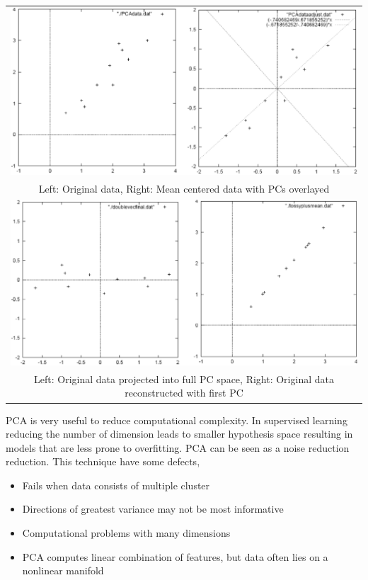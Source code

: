 \documentclass[main.tex]{subfiles}
\begin{document}
\begin{center}
\begin{tabular}{c}
  \includegraphics[width=140mm]{img/PAC_1.PNG} \\
Left: Original data, Right: Mean centered data with PCs overlayed \\[6pt]
 \includegraphics[width=140mm]{img/PAC_2.PNG} \\
Left: Original data projected into full PC space, Right: Original data reconstructed with first PC\\[6pt]
\end{tabular}
\end{center}

PCA is very useful to reduce computational complexity. In supervised learning reducing the number of dimension leads to smaller hypothesis space resulting in models that are less prone to overfitting. PCA can be seen as a noise reduction reduction.
This technique have some defects,
\begin{itemize}
    \item Fails when data consists of multiple cluster
    \item Directions of greatest variance may not be most informative
    \item Computational problems with many dimensions
    \item PCA computes linear combination of features, but data often lies on a nonlinear manifold
\end{itemize}
\end{document}
